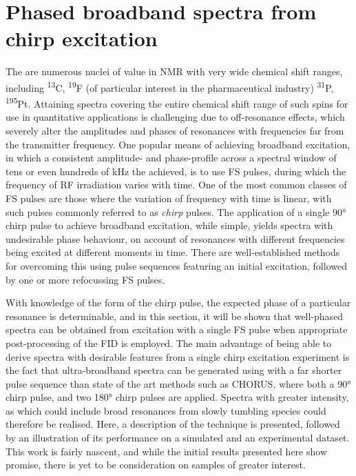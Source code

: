 \section{Phased broadband spectra from chirp excitation}
\label{sec:bbqchili}

The are numerous nuclei of value in \ac{NMR} with very wide chemical shift
ranges, including \textsuperscript{13}C, \textsuperscript{19}F (of
particular interest in the pharmaceutical industry) \textsuperscript{31}P,
\textsuperscript{195}Pt.
Attaining spectra covering the entire chemical shift range of such spins for
use in quantitative applications is challenging due to off-resonance effects,
which severely alter the amplitudes and phases of resonances with frequencies
far from the transmitter frequency\cite[Section 3.4.1]{Cavanagh2007}. One
popular means of achieving broadband excitation, in which a consistent
amplitude- and phase-profile across a spectral window of tens or even hundreds
of \unit{\kilo\hertz} the achieved, is to use \ac{FS} pulses, during
which the frequency of \ac{RF} irradiation varies with
time\cite{Foroozandeh2020}. One of the most common classes of \ac{FS} pulses
are those where the variation of frequency with time is linear, with such
pulses commonly referred to as \emph{chirp} pulses. The application of a single
\ang{90} chirp pulse to achieve broadband excitation, while simple, yields
spectra with undesirable phase behaviour, on account of resonances with
different frequencies being excited at different moments in time.
There are well-established methods for overcoming this using
pulse sequences featuring an initial excitation, followed by one or more
refocussing \ac{FS}
pulses\cite{Bohlen1989,Bohlen1993,Cano2002,Power2016,Foroozandeh2019}.

With knowledge of the form of the chirp pulse, the expected phase of a
particular resonance is determinable, and in this section, it will be shown
that well-phased spectra can be obtained from excitation with a single \ac{FS}
pulse when appropriate post-processing of the \ac{FID} is employed.
The main advantage of being able to derive spectra with desirable features from
a single chirp excitation experiment is the fact that ultra-broadband spectra
can be generated using with a far shorter pulse sequence than state of the art
methods such as \ac{CHORUS}\cite{Power2016,Foroozandeh2019}, where both a
\ang{90} chirp pulse, and two \ang{180} chirp pulses are applied. Spectra with
greater intensity, as which could include broad resonances from slowly tumbling
species could therefore be realised.  Here, a description of the technique is
presented, followed by an illustration of its performance on a simulated and an
experimental dataset. This work is fairly nascent, and while the initial
results presented here show promise, there is yet to be consideration on
samples of greater interest.


